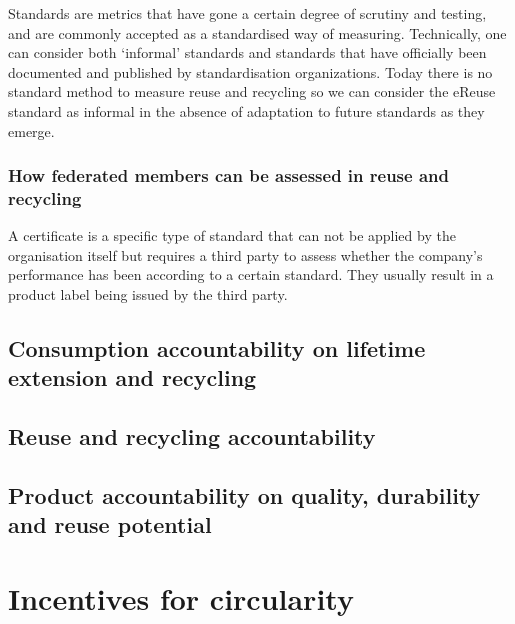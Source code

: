 \documentclass[
]{book}
\begin{document}
Standards are metrics that have gone a certain degree of scrutiny and testing, and are commonly accepted as a standardised way of measuring. Technically, one can consider both `informal' standards and standards that have officially been documented and published by standardisation organizations. Today there is no standard method to measure reuse and recycling so we can consider the eReuse standard as informal in the absence of adaptation to future standards as they emerge.

\hypertarget{how-federated-members-can-be-assessed-in-reuse-and-recycling}{%
\subsubsection{How federated members can be assessed in reuse and recycling}\label{how-federated-members-can-be-assessed-in-reuse-and-recycling}}

A certificate is a specific type of standard that can not be applied by the organisation itself but requires a third party to assess whether the company's performance has been according to a certain standard. They usually result in a product label being issued by the third party.

\hypertarget{consumption-accountability-on-lifetime-extension-and-recycling}{%
\subsection{Consumption accountability on lifetime extension and recycling}\label{consumption-accountability-on-lifetime-extension-and-recycling}}

\hypertarget{reuse-and-recycling-accountability}{%
\subsection{Reuse and recycling accountability}\label{reuse-and-recycling-accountability}}

\hypertarget{product-accountability-on-quality-durability-and-reuse-potential}{%
\subsection{Product accountability on quality, durability and reuse potential}\label{product-accountability-on-quality-durability-and-reuse-potential}}

\hypertarget{incentives-for-circularity}{%
\section{Incentives for circularity}\label{incentives-for-circularity}}
\end{document}
